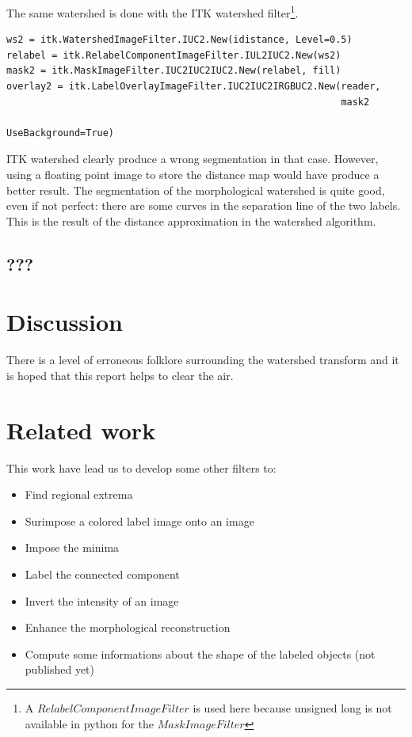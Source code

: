 \documentclass{InsightArticle}
\begin{document}
The same watershed is done with the ITK watershed filter\footnote{A
$RelabelComponentImageFilter$ is used here because unsigned long is
not available in python for the $MaskImageFilter$}.

\small \begin{verbatim}
ws2 = itk.WatershedImageFilter.IUC2.New(idistance, Level=0.5)
relabel = itk.RelabelComponentImageFilter.IUL2IUC2.New(ws2)
mask2 = itk.MaskImageFilter.IUC2IUC2IUC2.New(relabel, fill)
overlay2 = itk.LabelOverlayImageFilter.IUC2IUC2IRGBUC2.New(reader,
                                                           mask2
                                                           UseBackground=True)
\end{verbatim} \normalsize

ITK watershed clearly produce a wrong segmentation in that case. However, using
a floating point image to store the distance map would have produce a better
result.
The segmentation of the morphological watershed is quite good, even if not perfect:
there are some curves in the separation line of the two labels. This is the
result of the distance approximation in the watershed algorithm.

\subsection{???}


\section{Discussion}
There is a level of erroneous folklore surrounding the watershed
transform and it is hoped that this report helps to clear the air.


\section{Related work}
This work have lead us to develop some other filters to:
\begin{itemize}
  \item Find regional extrema \cite{regionalExtrema}
  \item Surimpose a colored label image onto an image \cite{labelOverlay}
  \item Impose the minima \cite{minimaImposition}
  \item Label the connected component \cite{connectedComponent}
  \item Invert the intensity of an image \cite{invert}
  \item Enhance the morphological reconstruction \cite{recons}
  \item Compute some informations about the shape of the labeled objects (not published yet)
\end{itemize}
\end{document}
